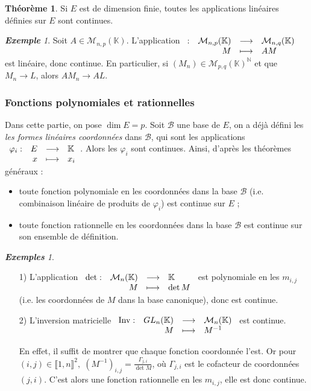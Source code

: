 \documentclass[12pt]{book}
\let\ensembleNombre\mathbb
\newcommand*\N{\ensuremath{\ensembleNombre{N}}}
\newcommand*\K{\ensuremath{\ensembleNombre{K}}}
\newcommand*\B{\ensuremath{\mathcal B}}
\newcommand{\app}[5]{\ensuremath{
\begin{array}[t]{lrcl}
#1 : & #2 & \longrightarrow & #3 \\
    & #4 & \longmapsto & #5 \end{array}
}}
\DeclareMathOperator{\Inv}{Inv}
\theoremstyle{definition}
\newtheorem{thme}{Théorème}[chapter]
\theoremstyle{remark}
\newtheorem*{ex}{\textbf{Exemple}}
\newtheorem*{exs}{\textbf{Exemples}}
\newenvironment{fthme}
  {\begin{mdframed}[roundcorner=10pt, linewidth=2pt]\begin{thme}}
  {\end{thme}\end{mdframed}}
\begin{document}
	\begin{fthme}
	Si $E$ est de dimension finie, toutes les applications linéaires définies sur $E$ sont continues.
	\end{fthme}
	
	\begin{ex}
	Soit $A \in \mathcal M_{n,p}(\K)$. L'application $\app{}{\mathcal M_{n,p}(\K)}{\mathcal M_{n,q}(\K)}{M}{AM}$ est linéaire, donc continue. En particulier, si $(M_n) \in \mathcal M_{p,q}(\K)^\N$ et que $M_n \longrightarrow L$, alors $AM_n \longrightarrow AL$.
	\end{ex}
	
			\subsubsection{Fonctions polynomiales et rationnelles}
	Dans cette partie, on pose $\dim E = p$. Soit $\B$ une base de $E$, on a déjà défini les \textit{les formes linéaires coordonnées} dans $\B$, qui sont les applications $\app{\varphi_i}{E}{\K}{x}{x_i}$. Alors les $\varphi_i$ sont continues. Ainsi, d'après les théorèmes généraux :
	\begin{itemize}
	\item toute fonction polynomiale en les coordonnées dans la base $\B$ (i.e. combinaison linéaire de produits de $\varphi_i$) est continue sur $E$ ;
	\item toute fonction rationnelle en les coordonnées dans la base $\B$ est continue sur son ensemble de définition.
	\end{itemize}
	
	\begin{exs}\mbox{~}\\
	\begin{itemize}
	\item[1)] L'application $\app{\det}{\mathcal M_n(\K)}{\K}{M}{\det M}$ est polynomiale en les $m_{i,j}$ (i.e. les coordonnées de $M$ dans la base canonique), donc est continue.
	\item[2)] L'inversion matricielle $\app{\Inv}{GL_n(\K)}{\mathcal M_n(\K)}{M}{M^{-1}}$ est continue. 
	
	En effet, il suffit de montrer que chaque fonction coordonnée l'est. Or pour $(i,j) \in \llbracket 1, n \rrbracket ^2,\; \left( M^{-1} \right)_{i,j} = \frac{\Gamma_{j,i}}{\det M}$, où $\Gamma_{j,i}$ est le cofacteur de coordonnées $(j,i)$. C'est alors une fonction rationnelle en les $m_{i,j}$, elle est donc continue.
	\end{itemize}
	\end{exs}
	
\end{document}
